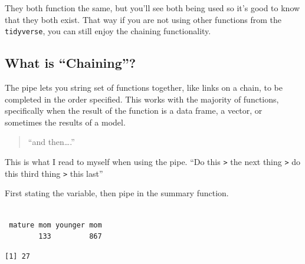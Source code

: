 \documentclass[
  letterpaper,
  DIV=11,
  numbers=noendperiod,
  oneside]{scrreprt}
\newenvironment{Shaded}{\begin{snugshade}}{\end{snugshade}}
\newcommand{\CommentTok}[1]{\textcolor[rgb]{0.37,0.37,0.37}{#1}}
\newcommand{\FunctionTok}[1]{\textcolor[rgb]{0.28,0.35,0.67}{#1}}
\newcommand{\NormalTok}[1]{\textcolor[rgb]{0.00,0.23,0.31}{#1}}
\newcommand{\SpecialCharTok}[1]{\textcolor[rgb]{0.37,0.37,0.37}{#1}}
\begin{document}
They both function the same, but you'll see both being used so it's good
to know that they both exist. That way if you are not using other
functions from the \texttt{tidyverse}, you can still enjoy the chaining
functionality.

\subsection{What is ``Chaining''?}\label{what-is-chaining}

The pipe lets you string set of functions together, like links on a
chain, to be completed in the order specified. This works with the
majority of functions, specifically when the result of the function is a
data frame, a vector, or sometimes the results of a model.

\begin{quote}
``and then\ldots.''
\end{quote}

This is what I read to myself when using the pipe. ``Do this
\texttt{\textbar{}\textgreater{}} the next thing
\texttt{\textbar{}\textgreater{}} do this third thing
\texttt{\textbar{}\textgreater{}} this last''

\begin{tcolorbox}[enhanced jigsaw, bottomrule=.15mm, colback=white, colframe=quarto-callout-tip-color-frame, toprule=.15mm, coltitle=black, rightrule=.15mm, opacitybacktitle=0.6, colbacktitle=quarto-callout-tip-color!10!white, toptitle=1mm, leftrule=.75mm, breakable, bottomtitle=1mm, titlerule=0mm, title={👉Example: Frequency tables \& summary statistics using the pipe}, arc=.35mm, left=2mm, opacityback=0]

First stating the variable, then pipe in the summary function.

\begin{Shaded}
\end{Shaded}

\begin{verbatim}

 mature mom younger mom 
        133         867 
\end{verbatim}

\begin{Shaded}
\end{Shaded}

\begin{verbatim}
[1] 27
\end{verbatim}

\end{tcolorbox}
\end{document}
